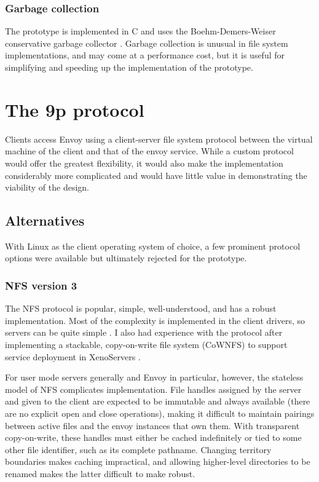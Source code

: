 \subsubsection{Garbage collection}

The prototype is implemented in C and uses the Boehm-Demers-Weiser conservative garbage collector \cite{boehm}. Garbage collection is unusual in file system implementations, and may come at a performance cost, but it is useful for simplifying and speeding up the implementation of the prototype.

\section{The 9p protocol}

Clients access Envoy using a client-server file system protocol between the virtual machine of the client and that of the envoy service. While a custom protocol would offer the greatest flexibility, it would also make the implementation considerably more complicated and would have little value in demonstrating the viability of the design.

\subsection{Alternatives}

With Linux as the client operating system of choice, a few prominent protocol options were available but ultimately rejected for the prototype.

\subsubsection{NFS version 3}

The NFS protocol is popular, simple, well-understood, and has a robust implementation. Most of the complexity is implemented in the client drivers, so servers can be quite simple \cite{sandberg,pawlowski,callaghan}. I also had experience with the protocol after implementing a stackable, copy-on-write file system (CoWNFS) to support service deployment in XenoServers \cite{kotsovinos04b}.

For user mode servers generally and Envoy in particular, however, the stateless model of NFS complicates implementation. File handles assigned by the server and given to the client are expected to be immutable and always available (there are no explicit open and close operations), making it difficult to maintain pairings between active files and the envoy instances that own them. With transparent copy-on-write, these handles must either be cached indefinitely or tied to some other file identifier, such as its complete pathname. Changing territory boundaries makes caching impractical, and allowing higher-level directories to be renamed makes the latter difficult to make robust.

